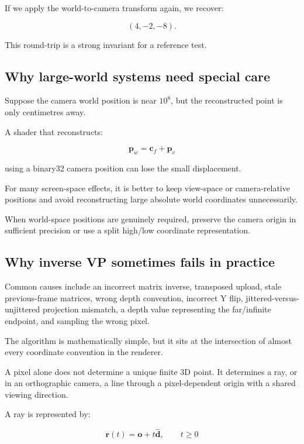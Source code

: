 If we apply the world-to-camera transform again, we recover:

\[ (4,-2,-8). \]

This round-trip is a strong invariant for a reference test.

\subsection{Why large-world systems need special care}\label{02-foundations-ii-ch035-why-large-world-systems-need-special-care}

Suppose the camera world position is near \(10^8\), but the reconstructed point is only centimetres away.

A shader that reconstructs:

\[ \mathbf p_w=\mathbf c_f+\mathbf p_v \]

using a binary32 camera position can lose the small displacement.

For many screen-space effects, it is better to keep view-space or camera-relative positions and avoid reconstructing large absolute world coordinates unnecessarily.

When world-space positions are genuinely required, preserve the camera origin in sufficient precision or use a split high/low coordinate representation.

\subsection{Why inverse VP sometimes fails in practice}\label{02-foundations-ii-ch035-why-inverse-vp-sometimes-fails-in-practice}

Common causes include an incorrect matrix inverse, transposed upload, stale previous-frame matrices, wrong depth convention, incorrect Y flip, jittered-versus-unjittered projection mismatch, a depth value representing the far/infinite endpoint, and sampling the wrong pixel.

The algorithm is mathematically simple, but it sits at the intersection of almost every coordinate convention in the renderer.

A pixel alone does not determine a unique finite 3D point. It determines a ray, or in an orthographic camera, a line through a pixel-dependent origin with a shared viewing direction.

A ray is represented by:

\[ \boxed{ \mathbf r(t)=\mathbf o+t\hat{\mathbf d}, \qquad t\ge0 } \]

